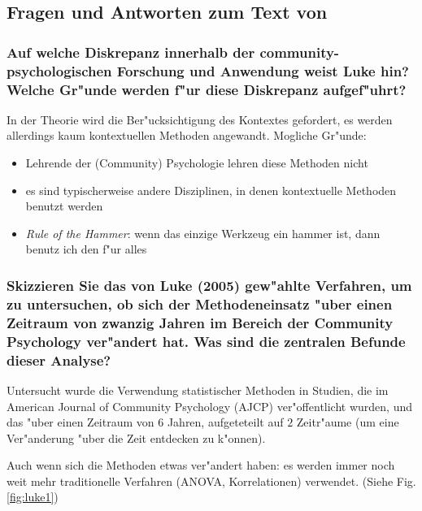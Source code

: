 \subsection{Fragen und Antworten zum Text von \textcite{luke_getting_2005}}
\subsubsection{Auf welche Diskrepanz innerhalb der community-psychologischen Forschung und Anwendung weist Luke hin? Welche Gr"unde werden f"ur diese Diskrepanz aufgef"uhrt?}
In der Theorie wird die Ber"ucksichtigung des Kontextes gefordert, es werden allerdings kaum kontextuellen Methoden angewandt. Mogliche Gr"unde:
\begin{itemize}
  \item Lehrende der (Community) Psychologie lehren diese Methoden nicht
  \item es sind typischerweise andere Disziplinen, in denen kontextuelle Methoden benutzt werden
  \item \emph{Rule of the Hammer}: wenn das einzige Werkzeug ein hammer ist, dann benutz ich den f"ur alles
\end{itemize}

\subsubsection{Skizzieren Sie das von Luke (2005) gew"ahlte Verfahren, um zu untersuchen, ob sich der Methodeneinsatz "uber einen Zeitraum von zwanzig Jahren im Bereich der Community Psychology ver"andert hat. Was sind die zentralen Befunde dieser Analyse?}
Untersucht wurde die Verwendung statistischer Methoden in Studien, die im American Journal of Community Psychology (AJCP) ver"offentlicht wurden, und das "uber einen Zeitraum von $6$ Jahren, aufgeteteilt auf $2$ Zeitr"aume (um eine Ver"anderung "uber die  Zeit entdecken zu k"onnen).

Auch wenn sich die Methoden etwas ver"andert haben: es werden immer noch weit mehr traditionelle Verfahren (ANOVA, Korrelationen) verwendet. (Siehe Fig. \ref{fig:luke1})

